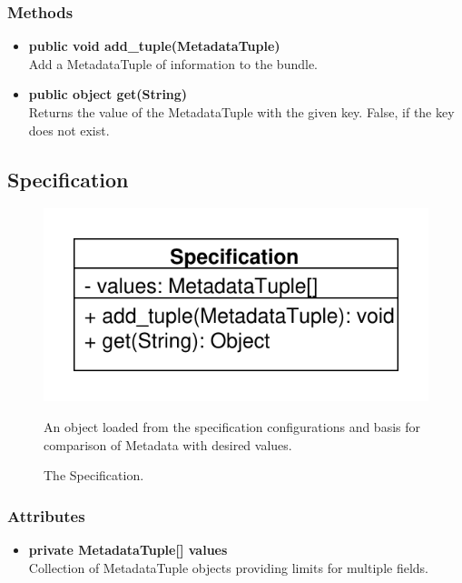 \subsubsection{Methods}
\begin{itemize}
	\item \textbf{public void add\_tuple(MetadataTuple)}\\
	Add a MetadataTuple of information to the bundle.
	\item \textbf{public object get(String)}\\
	Returns the value of the MetadataTuple with the given key. False, if the key does not exist.
\end{itemize}


\subsection{Specification}
\begin{figure}[htbp]
	\begin{minipage}[t]{7cm}
		\vspace{0pt}
		\centering
		\includegraphics[scale=0.6]{./diagram_pictures/Specification.pdf}
		\caption{The Specification.}
	\end{minipage}
	\hfill
	\begin{minipage}[t]{8cm}
		\vspace{10pt}
		An object loaded from the specification configurations and basis for comparison of Metadata with desired values.
	\end{minipage}
\end{figure}

\subsubsection{Attributes}
\begin{itemize}
	\item \textbf{private MetadataTuple[] values}\\
	Collection of MetadataTuple objects providing limits for multiple fields.
\end{itemize}
